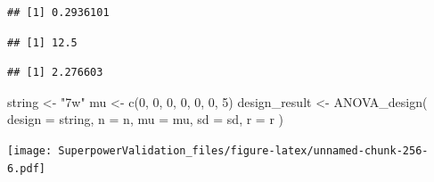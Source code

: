 \documentclass[
]{book}
\newenvironment{Shaded}{\begin{snugshade}}{\end{snugshade}}
\newcommand{\AttributeTok}[1]{\textcolor[rgb]{0.77,0.63,0.00}{#1}}
\newcommand{\DecValTok}[1]{\textcolor[rgb]{0.00,0.00,0.81}{#1}}
\newcommand{\FunctionTok}[1]{\textcolor[rgb]{0.00,0.00,0.00}{#1}}
\newcommand{\NormalTok}[1]{#1}
\newcommand{\OtherTok}[1]{\textcolor[rgb]{0.56,0.35,0.01}{#1}}
\newcommand{\SpecialCharTok}[1]{\textcolor[rgb]{0.00,0.00,0.00}{#1}}
\newcommand{\StringTok}[1]{\textcolor[rgb]{0.31,0.60,0.02}{#1}}
\begin{document}
\begin{verbatim}
## [1] 0.2936101
\end{verbatim}

\begin{Shaded}
\end{Shaded}

\begin{verbatim}
## [1] 12.5
\end{verbatim}

\begin{Shaded}
\end{Shaded}

\begin{verbatim}
## [1] 2.276603
\end{verbatim}

\begin{Shaded}
\begin{Highlighting}[]
\NormalTok{string }\OtherTok{\textless{}{-}} \StringTok{"7w"}
\NormalTok{mu }\OtherTok{\textless{}{-}} \FunctionTok{c}\NormalTok{(}\DecValTok{0}\NormalTok{, }\DecValTok{0}\NormalTok{, }\DecValTok{0}\NormalTok{, }\DecValTok{0}\NormalTok{, }\DecValTok{0}\NormalTok{, }\DecValTok{0}\NormalTok{, }\DecValTok{5}\NormalTok{) }
\NormalTok{design\_result }\OtherTok{\textless{}{-}} \FunctionTok{ANOVA\_design}\NormalTok{(}
  \AttributeTok{design =}\NormalTok{ string,}
  \AttributeTok{n =}\NormalTok{ n,}
  \AttributeTok{mu =}\NormalTok{ mu,}
  \AttributeTok{sd =}\NormalTok{ sd,}
  \AttributeTok{r =}\NormalTok{ r}
\NormalTok{)}
\end{Highlighting}
\end{Shaded}

\texttt{[image: SuperpowerValidation\_files/figure-latex/unnamed-chunk-256-6.pdf]}
\end{document}
